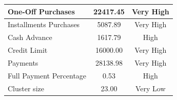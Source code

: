 \begin{center}
\begin{minipage}[t]{0.48\textwidth}
{\begin{tabular}{|l|c|c|}
One-Off Purchases & 22417.45 & Very High \\ \hline
Installments Purchases & 5087.89 & Very High \\ \hline
Cash Advance & 1617.79 & High \\ \hline
Credit Limit & 16000.00 & Very High \\ \hline
Payments & 28138.98 & Very High \\ \hline
Full Payment Percentage & 0.53 & High \\ \hline
Cluster size & 23.00 & Very Low \\ \hline
\end{tabular}}
\end{minipage}

\vspace{0.7cm}


\end{center}
